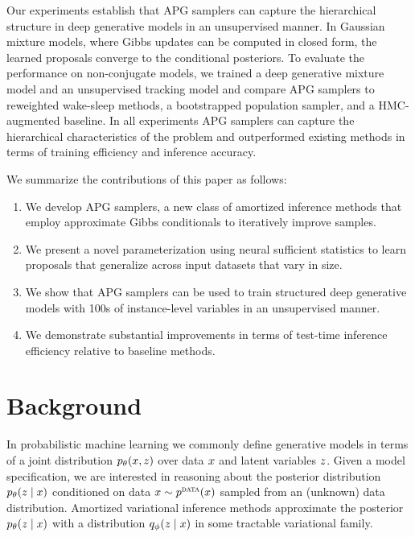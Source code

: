 \documentclass{article}
\theoremstyle{definition}
\begin{document}
Our experiments establish that APG samplers can capture the hierarchical structure in deep generative models in an unsupervised manner.
In Gaussian mixture models, where Gibbs updates can be computed in closed form, the learned proposals converge to the conditional posteriors.
To evaluate the performance on non-conjugate models, we trained a deep generative mixture model and an unsupervised tracking model and compare APG samplers to reweighted wake-sleep methods, a bootstrapped population sampler, and a HMC-augmented baseline. In all experiments APG samplers can capture the hierarchical characteristics of the problem and outperformed existing methods in terms of training efficiency and inference accuracy.

We summarize the contributions of this paper as follows: 
\begin{enumerate}[labelwidth=0.5em,labelsep=0.5em,leftmargin=1.0em,topsep=0em,itemsep=\parsep]
    \vspace{-0.1em}
    \item We develop APG samplers, a new class of amortized inference methods that employ approximate Gibbs conditionals to iteratively improve samples.
    \vspace{-0.1em}
    \item We present a novel parameterization using neural sufficient statistics to learn proposals that generalize across input datasets that vary in size.
    \vspace{-0.1em}
    \item We show that APG samplers can be used to train structured deep generative models with 100s of instance-level variables in an unsupervised manner.
    \vspace{-0.1em}
    \item We demonstrate substantial improvements in terms of test-time inference efficiency relative to baseline methods.
\end{enumerate}



\vspace{-0.5em}
\section{Background}
\label{sec:background}
\vspace{0.2em}

In probabilistic machine learning we commonly define generative models in terms of a joint distribution $p_\theta(x, z)$ over data $x$ and latent variables $z$. Given a model specification, we are interested in reasoning about the posterior distribution $p_\theta(z \mid x)$ conditioned on data $x \sim p^\textsc{data}(x)$ sampled from an (unknown) data distribution. Amortized variational inference methods approximate the posterior $p_\theta(z \mid x)$ with a distribution $q_\phi(z \mid x)$ in some tractable variational family.
\end{document}
